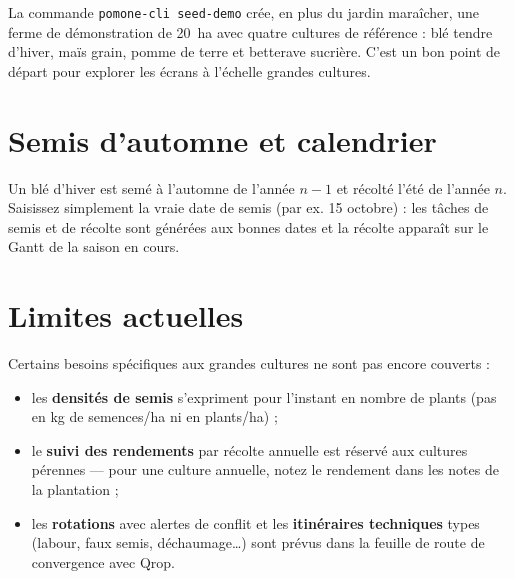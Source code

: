 \begin{notebox}
La commande \texttt{pomone-cli seed-demo} crée, en plus du jardin maraîcher, une ferme de démonstration de 20~ha avec quatre cultures de référence : blé tendre d'hiver, maïs grain, pomme de terre et betterave sucrière. C'est un bon point de départ pour explorer les écrans à l'échelle grandes cultures.
\end{notebox}

\section{Semis d'automne et calendrier}

Un blé d'hiver est semé à l'automne de l'année $n-1$ et récolté l'été de l'année $n$. Saisissez simplement la vraie date de semis (par ex. 15 octobre) : les tâches de semis et de récolte sont générées aux bonnes dates et la récolte apparaît sur le Gantt de la saison en cours.

\section{Limites actuelles}

Certains besoins spécifiques aux grandes cultures ne sont pas encore couverts :

\begin{itemize}
  \item les \textbf{densités de semis} s'expriment pour l'instant en nombre de plants (pas en kg de semences/ha ni en plants/ha) ;
  \item le \textbf{suivi des rendements} par récolte annuelle est réservé aux cultures pérennes — pour une culture annuelle, notez le rendement dans les notes de la plantation ;
  \item les \textbf{rotations} avec alertes de conflit et les \textbf{itinéraires techniques} types (labour, faux semis, déchaumage…) sont prévus dans la feuille de route de convergence avec Qrop.
\end{itemize}
